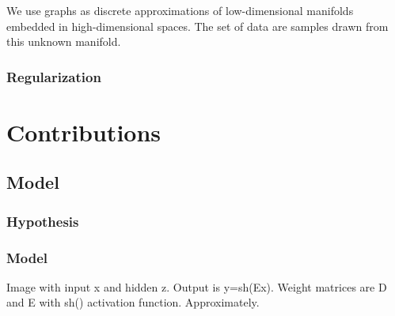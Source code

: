 \documentclass[a4paper,12pt,twoside]{report}
\begin{document}
We use graphs as discrete approximations of low-dimensional manifolds embedded in high-dimensional spaces. The set of data are samples drawn from this unknown manifold.

\section{Regularization} \label{sec:graph_regularization}

\part{Contributions} \label{part:contributions}

\chapter{Model} \label{chap:model}

\section{Hypothesis}



\section{Model}


{\color{red} Image with input x and hidden z. Output is y=sh(Ex). Weight matrices are D and E with sh() activation function. Approximately.}
\end{document}
